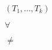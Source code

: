 \documentclass{article}
\begin{document}
$(T_1, \ldots, T_k)$
\pagebreak

$ \forall $
\pagebreak

$ \neq $
\pagebreak
\end{document}
